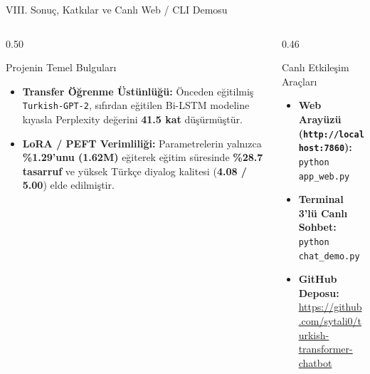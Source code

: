 \documentclass[aspectratio=169,10pt]{beamer}
\begin{document}
\begin{frame}{VIII. Sonuç, Katkılar ve Canlı Web / CLI Demosu}
    \begin{columns}[T]
        \begin{column}{0.50\textwidth}
            \begin{block}{Projenin Temel Bulguları}
                \begin{itemize}
                    \item[$\checkmark$] \textbf{Transfer Öğrenme Üstünlüğü:} Önceden eğitilmiş \texttt{Turkish-GPT-2}, sıfırdan eğitilen Bi-LSTM modeline kıyasla Perplexity değerini \textbf{41.5 kat} düşürmüştür.
                    \item[$\checkmark$] \textbf{LoRA / PEFT Verimliliği:} Parametrelerin yalnızca \textbf{\%1.29'unu (1.62M)} eğiterek eğitim süresinde \textbf{\%28.7 tasarruf} ve yüksek Türkçe diyalog kalitesi (\textbf{4.08 / 5.00}) elde edilmiştir.
                \end{itemize}
            \end{block}
        \end{column}
        \begin{column}{0.46\textwidth}
            \begin{block}{Canlı Etkileşim Araçları}
                \begin{itemize}
                    \item \textbf{Web Arayüzü (\texttt{http://localhost:7860}):}\\
                    \texttt{python app\_web.py}
                    \item \textbf{Terminal 3'lü Canlı Sohbet:}\\
                    \texttt{python chat\_demo.py}
                    \item \textbf{GitHub Deposu:}\\
                    {\scriptsize \url{https://github.com/sytali0/turkish-transformer-chatbot}}
                \end{itemize}
            \end{block}
        \end{column}
    \end{columns}
\end{frame}
\end{document}
